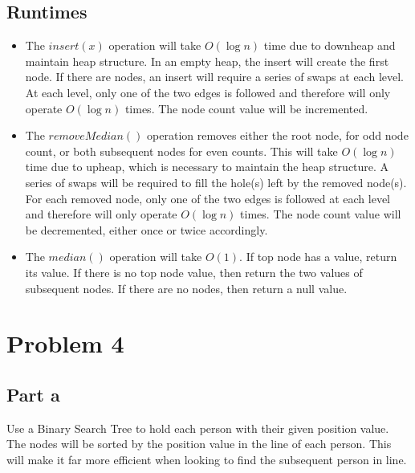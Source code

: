 \documentclass{article}
\begin{document}
\subsection*{Runtimes}
\begin{itemize}
    \item The $insert(x)$ operation will take $O(\log n)$ time due to downheap and maintain heap structure.
        In an empty heap, the insert will create the first node.
        If there are nodes, an insert will require a series of swaps at each level.
        At each level, only one of the two edges is followed and therefore will only operate $O(\log n)$ times.
        The node count value will be incremented.
    \item The $removeMedian()$ operation removes either the root node, for odd node count, or both subsequent nodes for even counts.
        This will take $O(\log n)$ time due to upheap, which is necessary to maintain the heap structure.
        A series of swaps will be required to fill the hole(s) left by the removed node(s).
        For each removed node, only one of the two edges is followed at each level and therefore will only operate $O(\log n)$ times.
        The node count value will be decremented, either once or twice accordingly.
    \item The $median()$ operation will take $O(1)$. If top node has a value, return its value.
        If there is no top node value, then return the two values of subsequent nodes.
        If there are no nodes, then return a null value.
\end{itemize}


\section{Problem 4}
\subsection{Part a}

Use a Binary Search Tree to hold each person with their given position value.
The nodes will be sorted by the position value in the line of each person.
This will make it far more efficient when looking to find the subsequent person in line.
\end{document}
